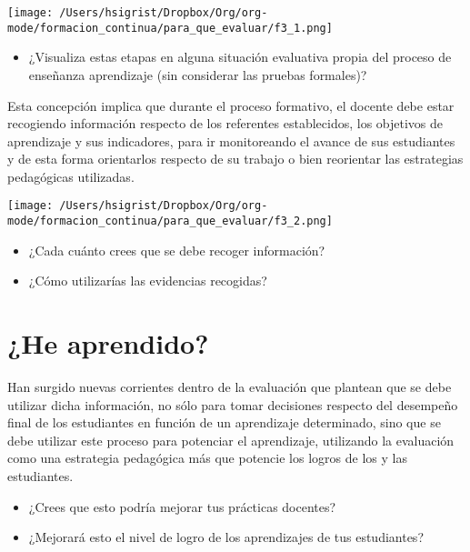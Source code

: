 \documentclass[12pt,letterpaper,article,x11names]{memoir}
\begin{document}
\begin{center}
\texttt{[image: /Users/hsigrist/Dropbox/Org/org-mode/formacion\_continua/para\_que\_evaluar/f3\_1.png]}
\end{center}

\begin{itemize}
\item ¿Visualiza estas etapas en alguna situación evaluativa propia del proceso de enseñanza aprendizaje (sin considerar las pruebas formales)?
\end{itemize}

Esta concepción implica que durante el proceso formativo, el docente debe estar recogiendo información respecto de los referentes establecidos, los objetivos de aprendizaje y sus indicadores, para ir monitoreando el avance de sus estudiantes y de esta forma orientarlos respecto de su trabajo o bien reorientar las estrategias pedagógicas utilizadas. 

\begin{center}
\texttt{[image: /Users/hsigrist/Dropbox/Org/org-mode/formacion\_continua/para\_que\_evaluar/f3\_2.png]}
\end{center}

\begin{itemize}
\item ¿Cada cuánto crees que se debe recoger información?
\item ¿Cómo utilizarías las evidencias recogidas?
\end{itemize}

\section{¿He aprendido?}
\label{sec:org228339a}
Han surgido nuevas corrientes dentro de la evaluación que plantean que se debe utilizar dicha información, no sólo para tomar decisiones respecto del desempeño final de los estudiantes en función de un aprendizaje determinado, sino que se debe utilizar este proceso para potenciar el aprendizaje, utilizando la evaluación como una estrategia pedagógica más que potencie los logros de los y las estudiantes.

\begin{itemize}
\item ¿Crees que esto podría mejorar tus prácticas docentes?
\item ¿Mejorará esto el nivel de logro de los aprendizajes de tus estudiantes?
\end{itemize}
\end{document}
